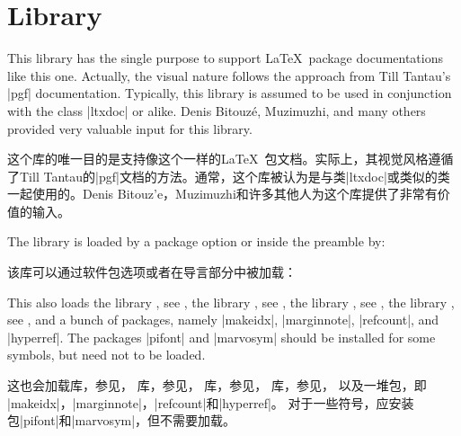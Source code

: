 \section{Library }\label{sec:documentation}%
%
This library has the single purpose to support \LaTeX\ package documentations
like this one. Actually, the visual nature follows the approach from
Till Tantau's |pgf| \cite{tantau:tikz_and_pgf} documentation.
Typically, this library is assumed to be used in conjunction with the
class |ltxdoc| or alike.
Denis Bitouz\'e, Muzimuzhi, and many others provided very valuable input for this library.

这个库的唯一目的是支持像这个一样的\LaTeX\ 包文档。实际上，其视觉风格遵循了Till Tantau的|pgf|\cite{tantau:tikz_and_pgf}文档的方法。通常，这个库被认为是与类|ltxdoc|或类似的类一起使用的。Denis Bitouz'e，Muzimuzhi和许多其他人为这个库提供了非常有价值的输入。

The library is loaded by a package option or inside the preamble by:

该库可以通过软件包选项或者在导言部分中被加载：
\begin{dispListing}
\end{dispListing}
This also loads
the library , see ,
the library , see ,
the library , see ,
the library , see ,
and a bunch of packages, namely
|makeidx|, |marginnote|, |refcount|, and |hyperref|.
The packages |pifont| and |marvosym| should be installed for some symbols, but
need not to be loaded.

这也会加载库，参见， 库，参见， 库，参见， 库，参见， 以及一堆包，即 |makeidx|，|marginnote|，|refcount|和|hyperref|。 对于一些符号，应安装包|pifont|和|marvosym|，但不需要加载。

